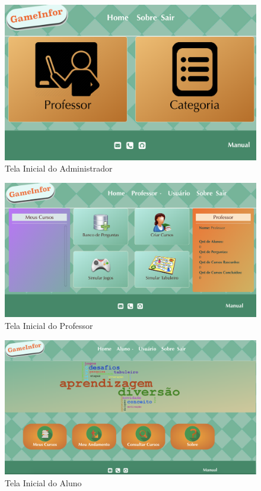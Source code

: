 \begin{figure}[H]
  \centering
  \includegraphics[scale=0.45]{images/proposta-img/Figura4-10.png}
  \caption{Tela Inicial do Administrador}
  \label{fig:Figura4-10}
\end{figure}

\begin{figure}[H]
  \centering
  \includegraphics[scale=0.4]{images/proposta-img/Figura4-11.png}
  \caption{Tela Inicial do Professor}
  \label{fig:Figura4-11}
\end{figure}

\begin{figure}[H]
  \centering
  \includegraphics[scale=0.34]{images/proposta-img/Figura4-12.png}
  \caption{Tela Inicial do Aluno}
  \label{fig:Figura4-12}
\end{figure}


